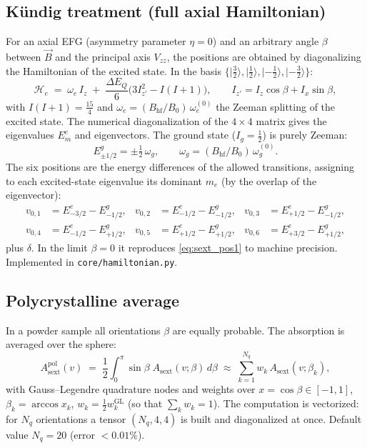 \documentclass[11pt,a4paper]{article}
\newcommand{\BHF}{B_{\mathrm{hf}}}
\newcommand{\dEQ}{\Delta E_{Q}}
\newcommand{\file}[1]{\textcolor{black!70}{\texttt{\small #1}}}
\begin{document}
\subsection{Kündig treatment (full axial Hamiltonian)}\label{sec:kundig}
For an axial EFG (asymmetry parameter $\eta=0$) and an arbitrary angle $\beta$ between
$\vec B$ and the principal axis $V_{zz}$, the positions are obtained by diagonalizing the
Hamiltonian of the excited state. In the basis $\{\lvert\tfrac32\rangle,
\lvert\tfrac12\rangle, \lvert{-}\tfrac12\rangle, \lvert{-}\tfrac32\rangle\}$:
\begin{equation}
  \mathcal H_e \;=\; \omega_e\, I_z \;+\; \frac{\dEQ}{6}\bigl(3 I_{z'}^2 - I(I+1)\bigr),
  \qquad I_{z'} = I_z\cos\beta + I_x\sin\beta,
  \label{eq:Hkundig}
\end{equation}
with $I(I+1)=\tfrac{15}{4}$ and $\omega_e=(\BHF/B_0)\,\omega_e^{(0)}$ the
Zeeman splitting of the excited state. The numerical diagonalization of the
$4\times4$ matrix gives the eigenvalues $E^{e}_{m}$ and eigenvectors. The ground state
($I_g=\tfrac12$) is purely Zeeman:
\begin{equation}
  E^{g}_{\pm 1/2} = \pm\tfrac12\,\omega_g, \qquad \omega_g=(\BHF/B_0)\,\omega_g^{(0)}.
\end{equation}
The six positions are the energy differences of the allowed transitions,
assigning to each excited-state eigenvalue its dominant $m_e$ (by the overlap of
the eigenvector):
\begin{equation}
\begin{aligned}
  v_{0,1}&=E^{e}_{-3/2}-E^{g}_{-1/2}, & v_{0,2}&=E^{e}_{-1/2}-E^{g}_{-1/2}, & v_{0,3}&=E^{e}_{+1/2}-E^{g}_{-1/2},\\
  v_{0,4}&=E^{e}_{-1/2}-E^{g}_{+1/2}, & v_{0,5}&=E^{e}_{+1/2}-E^{g}_{+1/2}, & v_{0,6}&=E^{e}_{+3/2}-E^{g}_{+1/2},
\end{aligned}
\end{equation}
plus $\delta$. In the limit $\beta=0$ it reproduces \eqref{eq:sext_pos1} to machine
precision. Implemented in \file{core/hamiltonian.py}.

\subsection{Polycrystalline average}\label{sec:powder}
In a powder sample all orientations $\beta$ are equally probable. The
absorption is averaged over the sphere:
\begin{equation}
  A_{\text{sext}}^{\text{pol}}(v) \;=\; \frac12\int_0^{\pi}\!\sin\beta\;A_{\text{sext}}(v;\beta)\,d\beta
  \;\approx\; \sum_{k=1}^{N_q} w_k\, A_{\text{sext}}(v;\beta_k),
  \label{eq:powder}
\end{equation}
with Gauss–Legendre quadrature nodes and weights over $x=\cos\beta\in[-1,1]$,
$\beta_k=\arccos x_k$, $w_k=\tfrac12 w_k^{\mathrm{GL}}$ (so that
$\sum_k w_k=1$). The computation is vectorized: for $N_q$ orientations a
tensor $(N_q,4,4)$ is built and diagonalized at once. Default value
$N_q=20$ (error $<0.01\%$).
\end{document}
